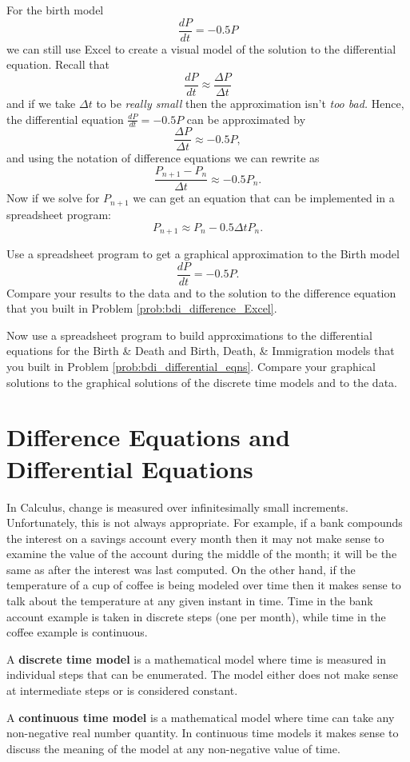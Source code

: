 For the birth model
\[ \frac{dP}{dt} = -0.5P \]
we can still use Excel to create a visual model of the solution to the differential
equation.  Recall that 
\[ \frac{dP}{dt} \approx \frac{\Delta P}{\Delta t} \]
and if we take $\Delta t$ to be {\it really small} then the approximation isn't {\it too
bad.}  Hence, the differential equation $\frac{dP}{dt} = -0.5 P$ can be approximated by
\[ \frac{\Delta P}{\Delta t} \approx -0.5 P, \]
and using the notation of difference equations we can rewrite as
\[ \frac{P_{n+1} - P_n}{\Delta t} \approx -0.5 P_n. \]
Now if we solve for $P_{n+1}$ we can get an equation that can be implemented in a
spreadsheet program:
\[ P_{n+1} \approx P_n - 0.5 \Delta t P_n. \]

\begin{problem}
    Use a spreadsheet program to get a graphical approximation to the Birth model
    \[ \frac{dP}{dt} = -0.5P. \]
    Compare your results to the data and to the solution to the difference equation that
    you built in Problem \ref{prob:bdi_difference_Excel}.
\end{problem}

\begin{problem}
    Now use a spreadsheet program to build approximations to the differential equations
    for the Birth \& Death and Birth, Death, \& Immigration models that you built in
    Problem \ref{prob:bdi_differential_eqns}.  Compare your graphical solutions to the
    graphical solutions of the discrete time models and to the data.
\end{problem}

\section{Difference Equations and Differential Equations}
In Calculus, change is measured over infinitesimally small increments.  Unfortunately, this
is not always appropriate.  For example, if a bank compounds the interest on a savings
account every month then it may not make sense to examine the value of the account during
the middle of the month; it will be the same as after the interest was last computed.  On
the other hand, if the temperature of a cup of coffee is being modeled over time then it
makes sense to talk about the temperature at any given instant in time.  Time in the bank account
example is taken in discrete steps (one per month), while time in the coffee example is
continuous.

\begin{definition}
    A {\bf discrete time model} is a mathematical model where time is measured in
    individual steps that can be enumerated.  The model either does not make sense at
    intermediate steps or is considered constant.
\end{definition}
\begin{definition}
    A {\bf continuous time model} is a mathematical model where time can take any
    non-negative real number quantity.  In continuous time models it makes sense to
    discuss the meaning of the model at any non-negative value of time.
\end{definition}

